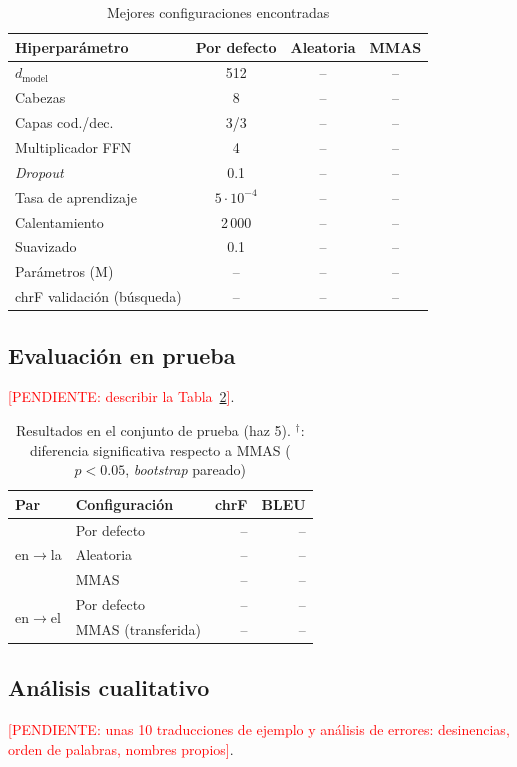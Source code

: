 \documentclass[conference]{IEEEtran}
\newcommand{\pendiente}[1]{\textcolor{red}{[PENDIENTE: #1]}}
\newcommand{\chrf}{chrF}
\begin{document}
\begin{table}[t]
\centering
\caption{Mejores configuraciones encontradas}
\label{tab:configuraciones}
\begin{tabular}{lccc}
\toprule
Hiperparámetro & Por defecto & Aleatoria & MMAS \\
\midrule
$d_\text{model}$ & 512 & -- & -- \\
Cabezas & 8 & -- & -- \\
Capas cod./dec. & 3/3 & -- & -- \\
Multiplicador FFN & 4 & -- & -- \\
\emph{Dropout} & 0.1 & -- & -- \\
Tasa de aprendizaje & $5{\cdot}10^{-4}$ & -- & -- \\
Calentamiento & 2\,000 & -- & -- \\
Suavizado & 0.1 & -- & -- \\
Parámetros (M) & -- & -- & -- \\
\chrf{} validación (búsqueda) & -- & -- & -- \\
\bottomrule
\end{tabular}
\end{table}

\subsection{Evaluación en prueba}
\pendiente{describir la Tabla~\ref{tab:resultados}}.

\begin{table}[t]
\centering
\caption{Resultados en el conjunto de prueba (haz 5). $^\dagger$:
diferencia significativa respecto a MMAS ($p < 0.05$, \emph{bootstrap}
pareado)}
\label{tab:resultados}
\begin{tabular}{llrr}
\toprule
Par & Configuración & \chrf{} & BLEU \\
\midrule
\multirow{3}{*}{en$\to$la} & Por defecto & -- & -- \\
                           & Aleatoria   & -- & -- \\
                           & MMAS        & -- & -- \\
\midrule
\multirow{2}{*}{en$\to$el} & Por defecto & -- & -- \\
                           & MMAS (transferida) & -- & -- \\
\bottomrule
\end{tabular}
\end{table}

\subsection{Análisis cualitativo}
\pendiente{unas 10 traducciones de ejemplo y análisis de errores:
desinencias, orden de palabras, nombres propios}.
\end{document}
